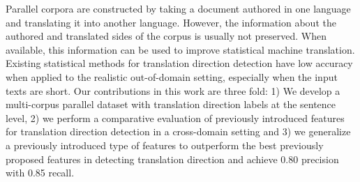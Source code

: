Parallel corpora are constructed by taking a document authored in one language and translating it into another language. However, the information about the authored and translated sides of the corpus is usually not preserved. When available, this information can be used to improve statistical machine translation. Existing statistical methods for translation direction detection have low accuracy when applied to the realistic out-of-domain setting, especially when the input texts are short. Our contributions in this work are three fold: 1) We develop a multi-corpus parallel dataset with translation direction labels at the sentence level, 2) we perform a comparative evaluation of previously introduced features for translation direction detection in a cross-domain setting and 3) we generalize a previously introduced type of features to outperform the best previously proposed features in detecting translation direction and achieve 0.80 precision with 0.85 recall.
